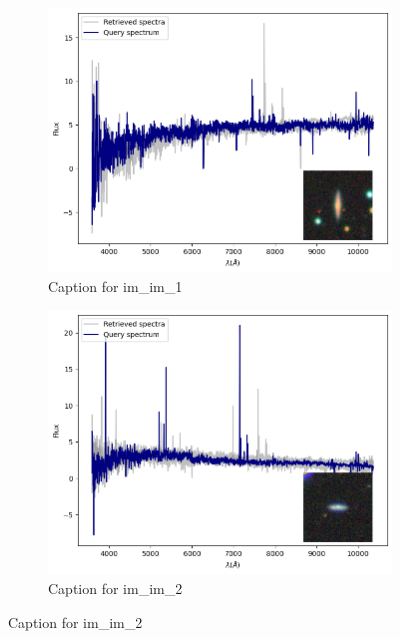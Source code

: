\documentclass[a4paper,12pt]{article}
\begin{document}
\begin{figure}[H]
    \centering
    \begin{subfigure}[b]{0.45\textwidth}
        \centering
        \includegraphics[width=\textwidth]{../figures/spectral_retrieval_im_im_1}
        \caption{Caption for im\_im\_1}
        \label{fig:im_im_1}
    \end{subfigure}%
    \hfill
    \begin{subfigure}[b]{0.45\textwidth}
        \centering
        \includegraphics[width=\textwidth]{../figures/spectral_retrieval_im_im_2}
        \caption{Caption for im\_im\_2}
        \label{fig:im_im_2}
    \end{subfigure}


\end{figure}
\end{document}
